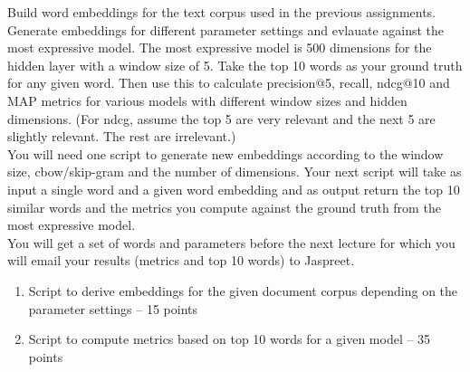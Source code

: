 \newcommand{\REM}[1]{}







\begin{hwproblem}

Build word embeddings for the text corpus used in the previous assignments. Generate embeddings for different parameter settings and evlauate against the most expressive model. The most expressive model is 500 dimensions for the hidden layer with a window size of 5. Take the top 10 words as your ground truth for any given word. Then use this to calculate precision@5, recall, ndcg@10 and MAP metrics for various models with different window sizes and hidden dimensions. (For ndcg, assume the top 5 are very relevant and the next 5 are slightly relevant. The rest are irrelevant.)
\\
You will need one script to generate new embeddings according to the window size, cbow/skip-gram and the number of dimensions. Your next script will take as input a single word and a given word embedding and as output return the top 10 similar words and the metrics you compute against the ground truth from the most expressive model.
 \\
You will get a set of words and parameters before the next lecture for which you will email your results (metrics and top 10 words) to Jaspreet.

\begin{enumerate}
	\item Script to derive embeddings for the given document corpus depending on the parameter settings -- 15 points
	\item Script to compute metrics based on top 10 words for a given model -- 35 points
\end{enumerate}
 
\hwsolution{

}

\end{hwproblem}





